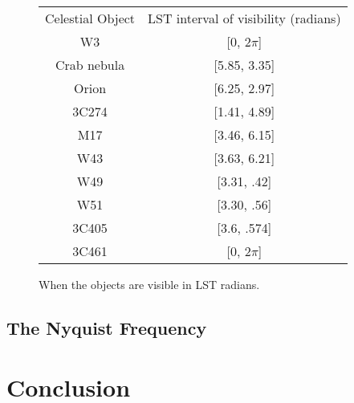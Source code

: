 \documentclass[11pt]{article}
\begin{document}
\begin{figure}
\centering
\begin{tabular}{c|c}
Celestial Object & LST interval of visibility (radians) \\
W3 & [0, 2$\pi$] \\
Crab nebula & [5.85, 3.35] \\
Orion & [6.25, 2.97] \\
3C274 & [1.41, 4.89] \\
M17 & [3.46, 6.15] \\
W43 & [3.63, 6.21] \\
W49 & [3.31, .42] \\
W51 & [3.30, .56] \\
3C405 & [3.6, .574] \\
3C461 & [0, 2$\pi$]
\end{tabular}
\caption{When the objects are visible in LST radians. \label{lsts}}
\end{figure}


\subsection{The Nyquist Frequency}




\section{Conclusion}

\end{document}
